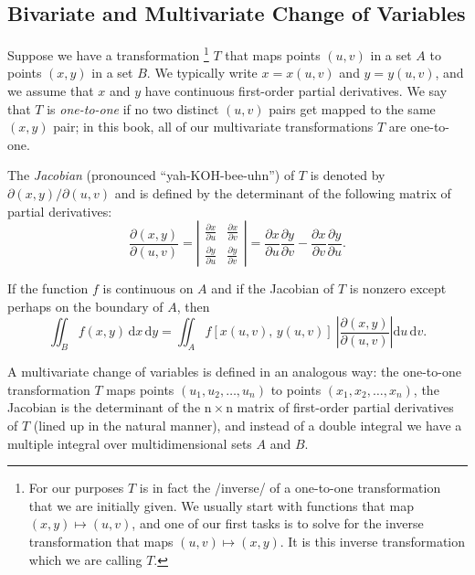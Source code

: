 \documentclass[captions=tableheading]{scrbook}
\begin{document}
\begin{example}
\subsection{Bivariate and Multivariate Change of Variables}
\label{sec-21-6-4}

Suppose we have a transformation
\footnote{For our purposes \(T\) is in fact the /inverse/ of a one-to-one transformation that we are initially given. We usually start with functions that map \((x,y) \longmapsto (u,v)\), and one of our first tasks is to solve for the inverse transformation that maps \((u,v)\longmapsto(x,y)\). It is this inverse transformation which we are calling \(T\).}
\(T\) that maps points \((u,v)\) in a set \(A\) to points \((x,y)\) in a set \(B\). We typically write \(x=x(u,v)\) and \(y=y(u,v)\), and we assume that \(x\) and \(y\) have continuous first-order partial derivatives. We say that \(T\) is \emph{one-to-one} if no two distinct \((u,v)\) pairs get mapped to the same \((x,y)\) pair; in this book, all of our multivariate transformations \(T\) are one-to-one.

The \emph{Jacobian} (pronounced ``yah-KOH-bee-uhn'') of \(T\) is denoted by \(\partial(x,y)/\partial(u,v)\) and is defined by the determinant of the following matrix of partial derivatives:
\begin{equation}
\frac{\partial(x,y)}{\partial(u,v)}=\left|
\begin{array}{cc}
\frac{\partial x}{\partial u} & \frac{\partial x}{\partial v}\\
\frac{\partial y}{\partial u} & \frac{\partial y}{\partial v}
\end{array}
\right|=\frac{\partial x}{\partial u}\frac{\partial y}{\partial v}-\frac{\partial x}{\partial v}\frac{\partial y}{\partial u}.
\end{equation}

If the function \(f\) is continuous on \(A\) and if the Jacobian of \(T\) is nonzero except perhaps on the boundary of \(A\), then 
\begin{equation}
\iint_{B}f(x,y)\,\mathrm{d} x\,\mathrm{d} y=\iint_{A}f\left[x(u,v),\, y(u,v)\right]\ \left|\frac{\partial(x,y)}{\partial(u,v)}\right|\mathrm{d} u\,\mathrm{d} v.
\end{equation} 

A multivariate change of variables is defined in an analogous way: the one-to-one transformation \(T\) maps points \((u_{1},u_{2},\ldots,u_{n})\) to points \((x_{1},x_{2},\ldots,x_{n})\), the Jacobian is the determinant of the \(\mathrm{n}\times\mathrm{n}\) matrix of first-order partial derivatives of \(T\) (lined up in the natural manner), and instead of a double integral we have a multiple integral over multidimensional sets \(A\) and \(B\).

\end{example}
\end{document}
